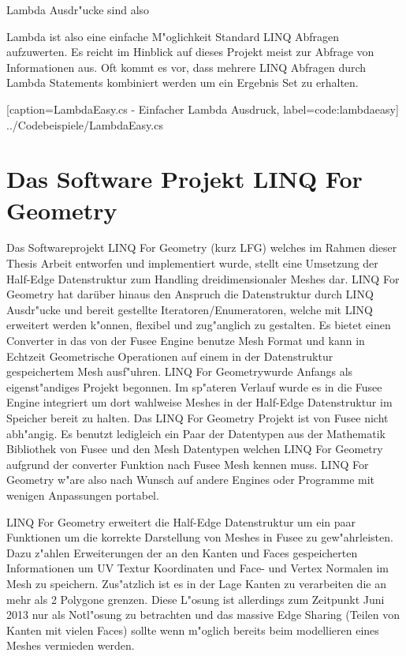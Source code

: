 \documentclass[pagesize, paper=a4, fontsize=12pt,titlepage=true, headings=small, headnosepline, abstractoff, liststotoc, nochapterprefix, plainheadsepline]{scrreprt}
\newcommand{\LFG}{LINQ For Geometry}
\newcommand{\LFGS}{LINQ For Geometry }
\newcommand{\HES}{Half-Edge Datenstruktur }
\begin{document}
Lambda Ausdr"ucke sind also 

Lambda ist also eine einfache M"oglichkeit Standard LINQ Abfragen aufzuwerten. Es reicht im Hinblick auf dieses Projekt meist zur Abfrage von Informationen aus. Oft kommt es vor, dass mehrere LINQ Abfragen durch Lambda Statements kombiniert werden um ein Ergebnis Set zu erhalten. 

			[caption={LambdaEasy.cs - Einfacher Lambda Ausdruck}, label=code:lambdaeasy]
			{../Codebeispiele/LambdaEasy.cs}


\section {Das Software Projekt LINQ For Geometry}
Das Softwareprojekt \LFGS (kurz LFG) welches im Rahmen dieser Thesis Arbeit entworfen und implementiert wurde, stellt eine Umsetzung der \HES zum Handling dreidimensionaler Meshes dar. \LFGS hat darüber hinaus den Anspruch die Datenstruktur durch LINQ Ausdr"ucke und bereit gestellte Iteratoren/Enumeratoren, welche mit LINQ erweitert werden k"onnen, flexibel und zug"anglich zu gestalten. Es bietet einen Converter in das von der Fusee Engine benutze Mesh Format und kann in Echtzeit Geometrische Operationen auf einem in der Datenstruktur gespeichertem Mesh ausf"uhren. \LFG wurde Anfangs als eigenst"andiges Projekt begonnen. Im sp"ateren Verlauf wurde es in die Fusee Engine integriert um dort wahlweise Meshes in der \HES im Speicher bereit zu halten. Das \LFGS Projekt ist von Fusee nicht abh"angig. Es benutzt ledigleich ein Paar der Datentypen aus der Mathematik Bibliothek von Fusee und den Mesh Datentypen welchen \LFGS aufgrund der converter Funktion nach Fusee Mesh kennen muss. \LFGS w"are also nach Wunsch auf andere Engines oder Programme mit wenigen Anpassungen portabel.

\LFGS erweitert die \HES um ein paar Funktionen um die korrekte Darstellung von Meshes in Fusee zu gew"ahrleisten. Dazu z"ahlen Erweiterungen der an den Kanten und Faces gespeicherten Informationen um UV Textur Koordinaten und Face- und Vertex Normalen im Mesh zu speichern.
Zus"atzlich ist es in der Lage Kanten zu verarbeiten die an mehr als 2 Polygone grenzen. Diese L"osung ist allerdings zum Zeitpunkt Juni 2013 nur als Notl"osung zu betrachten und das massive Edge Sharing (Teilen von Kanten mit vielen Faces) sollte wenn m"oglich bereits beim modellieren eines Meshes vermieden werden.
\newline
\end{document}
